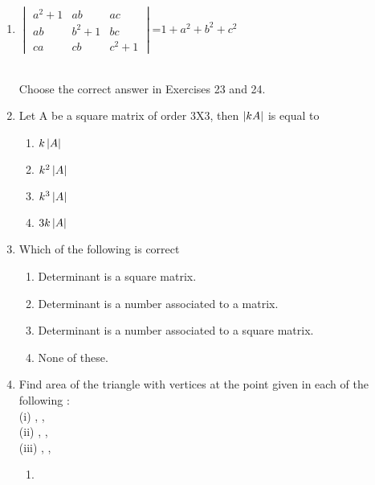\documentclass[journal,12pt,twocolumn]{IEEEtran}
\renewcommand\thesection{\arabic{section}}
\begin{document}
\begin{enumerate}[label=\thesection.\arabic*.,ref=\thesection.\theenumi]
\item $\begin{vmatrix}a^2+1&ab&ac \\ ab&b^2+1&bc \\ ca&cb&c^2+1\end{vmatrix}$=$1+a^2+b^2+c^2$\\
\\
\solution 

Choose the correct answer in Exercises 23 and 24.
\item Let A be a square matrix of order 3X3, then 
$\left\vert kA\right\vert$ is equal to
\begin{enumerate}
\item $k\left\vert A\right\vert$
\item $k^2\left\vert A\right\vert$
\item $k^3\left\vert A\right\vert$
\item $3k\left\vert A\right\vert$
\end{enumerate} 
\item Which of the following is correct
\begin{enumerate}
\item Determinant is a square matrix.
\item Determinant is a number associated to a matrix.
\item Determinant is a number associated to a square matrix.
\item None of these.
\end{enumerate}
\item Find area of the triangle with vertices at the point given in each of the following :\\
(i) , , \\
(ii) , , \\
(iii) , , \\
\solution 
\begin{enumerate}
    \item 
    
    


\end{enumerate}
\end{enumerate}
\end{document}

